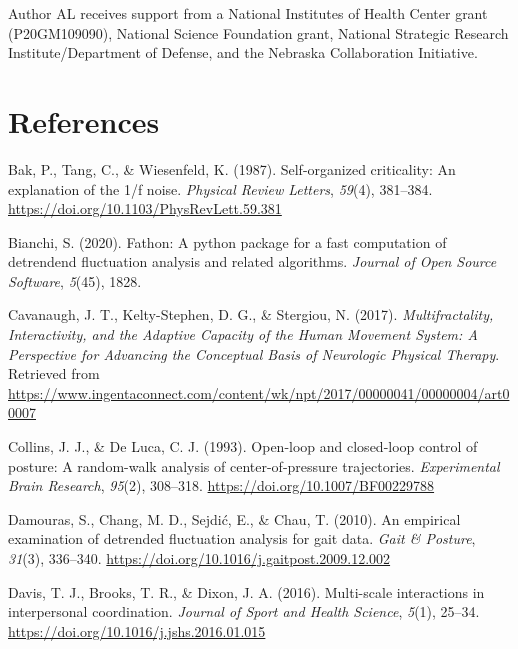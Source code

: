 \documentclass[
  man]{apa6}
\newlength{\cslhangindent}
\newlength{\cslentryspacingunit} %
\newenvironment{CSLReferences}[2] %
 {%
  \setlength{\parindent}{0pt}
  \ifodd #1
  \let\oldpar\par
  \def\par{\hangindent=\cslhangindent\oldpar}
  \fi
  \setlength{\parskip}{#2\cslentryspacingunit}
 }%
 {}
\begin{document}
Author AL receives support from a National Institutes of Health Center
grant (P20GM109090), National Science Foundation grant, National
Strategic Research Institute/Department of Defense, and the Nebraska
Collaboration Initiative.

\newpage

\hypertarget{references}{%
\section{References}\label{references}}

\begingroup
\setlength{\parindent}{-0.5in}
\setlength{\leftskip}{0.5in}

\hypertarget{refs}{}
\begin{CSLReferences}{1}{0}
\leavevmode{}%
Bak, P., Tang, C., \& Wiesenfeld, K. (1987). Self-organized criticality: {An} explanation of the 1/f noise. \emph{Physical Review Letters}, \emph{59}(4), 381--384. \url{https://doi.org/10.1103/PhysRevLett.59.381}

\leavevmode{}%
Bianchi, S. (2020). Fathon: A python package for a fast computation of detrendend fluctuation analysis and related algorithms. \emph{Journal of Open Source Software}, \emph{5}(45), 1828.

\leavevmode{}%
Cavanaugh, J. T., Kelty-Stephen, D. G., \& Stergiou, N. (2017). \emph{Multifractality, Interactivity, and the Adaptive Capacity of the Human Movement System: A Perspective for Advancing the Conceptual Basis of Neurologic Physical Therapy}. Retrieved from \url{https://www.ingentaconnect.com/content/wk/npt/2017/00000041/00000004/art00007}

\leavevmode{}%
Collins, J. J., \& De Luca, C. J. (1993). Open-loop and closed-loop control of posture: A random-walk analysis of center-of-pressure trajectories. \emph{Experimental Brain Research}, \emph{95}(2), 308--318. \url{https://doi.org/10.1007/BF00229788}

\leavevmode{}%
Damouras, S., Chang, M. D., Sejdić, E., \& Chau, T. (2010). An empirical examination of detrended fluctuation analysis for gait data. \emph{Gait \& Posture}, \emph{31}(3), 336--340. \url{https://doi.org/10.1016/j.gaitpost.2009.12.002}

\leavevmode{}%
Davis, T. J., Brooks, T. R., \& Dixon, J. A. (2016). Multi-scale interactions in interpersonal coordination. \emph{Journal of Sport and Health Science}, \emph{5}(1), 25--34. \url{https://doi.org/10.1016/j.jshs.2016.01.015}


\end{CSLReferences}
\end{document}
